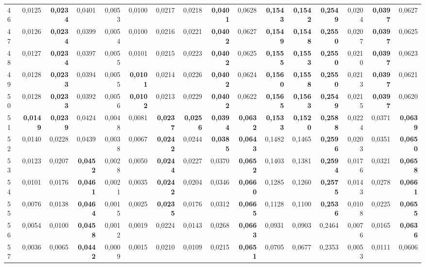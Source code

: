 \begin{table}[htp!]
\begin{adjustwidth}{-2cm}{}
\begin{tabular}{ l | *{15}{| r}}
46	&	0,0125	&	\textbf{0,0234}	&	0,0401	&	0,0053	&	0,0100	&	0,0217	&	0,0218	&	\textbf{0,0401}	&	0,0628	&	\textbf{0,1543}	&	\textbf{0,1542}	&	\textbf{0,2549}	&	0,0204	&	\textbf{0,0397}	&	0,0627	\\
47	&	0,0126	&	\textbf{0,0234}	&	0,0399	&	0,0054	&	0,0100	&	0,0216	&	0,0221	&	\textbf{0,0402}	&	0,0627	&	\textbf{0,1549}	&	\textbf{0,1548}	&	\textbf{0,2550}	&	0,0207	&	\textbf{0,0397}	&	0,0625	\\
48	&	0,0127	&	\textbf{0,0234}	&	0,0397	&	0,0055	&	0,0101	&	0,0215	&	0,0223	&	\textbf{0,0402}	&	0,0625	&	\textbf{0,1555}	&	\textbf{0,1553}	&	\textbf{0,2550}	&	0,0210	&	\textbf{0,0397}	&	0,0623	\\
49	&	0,0128	&	\textbf{0,0233}	&	0,0394	&	0,0055	&	\textbf{0,0101}	&	0,0214	&	0,0226	&	\textbf{0,0402}	&	0,0624	&	\textbf{0,1560}	&	\textbf{0,1558}	&	\textbf{0,2550}	&	0,0213	&	\textbf{0,0397}	&	0,0621	\\
50	&	0,0128	&	\textbf{0,0233}	&	0,0392	&	0,0056	&	\textbf{0,0102}	&	0,0213	&	0,0229	&	\textbf{0,0402}	&	0,0622	&	\textbf{0,1565}	&	\textbf{0,1563}	&	\textbf{0,2549}	&	0,0215	&	\textbf{0,0397}	&	0,0620	\\
51	&	\textbf{0,0149}	&	\textbf{0,0239}	&	0,0424	&	0,0048	&	0,0081	&	\textbf{0,0237}	&	\textbf{0,0256}	&	\textbf{0,0394}	&	\textbf{0,0632}	&	\textbf{0,1533}	&	\textbf{0,1520}	&	\textbf{0,2588}	&	0,0224	&	0,0371	&	\textbf{0,0639}	\\
52	&	0,0140	&	0,0228	&	0,0439	&	0,0038	&	0,0067	&	\textbf{0,0242}	&	0,0244	&	\textbf{0,0385}	&	\textbf{0,0643}	&	0,1482	&	0,1465	&	\textbf{0,2596}	&	0,0203	&	0,0351	&	\textbf{0,0650}	\\
53	&	0,0123	&	0,0207	&	\textbf{0,0452}	&	0,0028	&	0,0050	&	\textbf{0,0244}	&	0,0227	&	0,0370	&	\textbf{0,0652}	&	0,1403	&	0,1381	&	\textbf{0,2594}	&	0,0176	&	0,0321	&	\textbf{0,0658}	\\
54	&	0,0101	&	0,0176	&	\textbf{0,0461}	&	0,0021	&	0,0035	&	\textbf{0,0242}	&	0,0204	&	0,0346	&	\textbf{0,0660}	&	0,1285	&	0,1260	&	\textbf{0,2575}	&	0,0143	&	0,0278	&	\textbf{0,0661}	\\
55	&	0,0076	&	0,0138	&	\textbf{0,0464}	&	0,0015	&	0,0025	&	\textbf{0,0235}	&	0,0176	&	0,0312	&	\textbf{0,0665}	&	0,1128	&	0,1100	&	\textbf{0,2536}	&	0,0108	&	0,0225	&	\textbf{0,0655}	\\
56	&	0,0054	&	0,0100	&	\textbf{0,0458}	&	0,0012	&	0,0019	&	0,0224	&	0,0143	&	0,0268	&	\textbf{0,0663}	&	0,0931	&	0,0903	&	0,2464	&	0,0076	&	0,0165	&	\textbf{0,0636}	\\
57	&	0,0036	&	0,0065	&	\textbf{0,0442}	&	0,0009	&	0,0015	&	0,0210	&	0,0109	&	0,0215	&	\textbf{0,0651}	&	0,0705	&	0,0677	&	0,2353	&	0,0053	&	0,0111	&	0,0606	\\

\end{tabular}
\end{adjustwidth}
\end{table}
